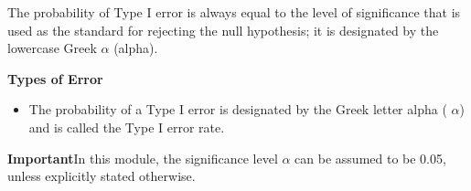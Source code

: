 The probability of Type I error is always equal to the level of significance that is used as the standard for rejecting
the null hypothesis; it is designated by the lowercase Greek $\alpha$ (alpha).





\textbf{Types of Error}
\begin{itemize}
\item The probability of a Type I error is designated by the Greek letter alpha ( $\alpha$) and is called the Type I error rate.

\end{itemize}




\begin{framed}
\noindent \textbf{Important}In this module, the significance level $\alpha$ can be assumed to be 0.05, unless explicitly stated otherwise.
\end{framed}





%
%
%

%
%
%

